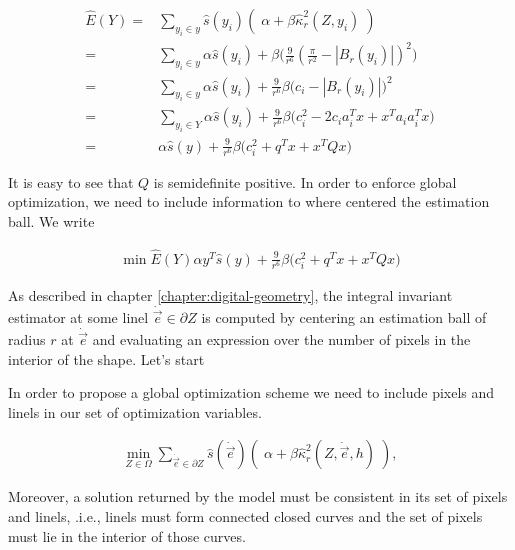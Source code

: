 \begin{align}
	\hat{E}(Y) =& \sum_{y_i \in y}{ \hat{s}(y_i)\left(\; \alpha + \beta \hat{\kappa}_{r}^2(Z,y_i) \; \right)}\\\nonumber
			   =& \sum_{y_i \in y} \alpha \hat{s}(y_i) + \beta \big( \frac{9}{r^6}(\frac{\pi}{r^2} - |B_r(y_i)|)^2\big)\\\nonumber
			   =& \sum_{y_i \in y} \alpha \hat{s}(y_i) + \frac{9}{r^6}\beta \big(c_i - |B_r(y_i)|\big)^2\\\nonumber
			   =& \sum_{y_i \in Y} \alpha \hat{s}(y_i) + \frac{9}{r^6}\beta \big(c_i^2 - 2c_ia_i^Tx + x^Ta_ia_i^Tx\big)\\\nonumber			   
			   =& \alpha \hat{s}(y) + \frac{9}{r^6}\beta \big(c_i^2 + q^Tx + x^TQx\big)
	\end{align}
	
	It is easy to see that $Q$ is semidefinite positive. In order to enforce global optimization, we need to include information to where centered the estimation ball. We write
	
	\begin{align*}
		\min \hat{E}(Y) \alpha y^T\hat{s}(y) + \frac{9}{r^6}\beta \big(c_i^2 + q^Tx + x^TQx\big)
	\end{align*}
	

 As described in chapter \ref{chapter:digital-geometry}, the integral invariant estimator at some linel $\dot{\vec{e}} \in \partial Z$ is computed by centering an estimation ball of radius $r$ at $\dot{\vec{e}}$ and evaluating an expression over the number of pixels in the interior of the shape. Let's start 



In order to propose a global optimization scheme we need to include pixels and linels in our set of optimization variables. 


	\begin{align*}
	\min_{Z \in \Omega} \sum_{\dot{\vec{e}} \in \partial Z}{ \hat{s}( \dot{\vec{e}})\left(\; \alpha + \beta \hat{\kappa}_{r}^2(Z,\dot{\vec{e}},h) \; \right)},
	\end{align*}


Moreover, a solution returned by the model must be consistent in its set of pixels and linels, .i.e., linels must form connected closed curves and the set of pixels must lie in the interior of those curves.



